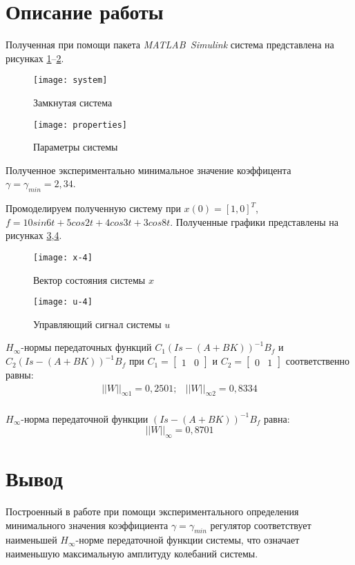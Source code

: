 \documentclass[14pt, a4paper]{extarticle}
\begin{document}
	\newpage
	
	\section*{Описание работы}
	
	Полученная при помощи пакета \textit{MATLAB~Simulink} система представлена на рисунках \ref{fig:system}--\ref{fig:properties}.
	
	\begin{figure}[H]
		\centering
		\texttt{[image: system]}
		\caption{Замкнутая система}
		\label{fig:system}
	\end{figure}
	
	\begin{figure}[H]
		\centering
		\texttt{[image: properties]}
		\caption{Параметры системы}
		\label{fig:properties}
	\end{figure}
	
	Полученное экспериментально минимальное значение коэффицента $\gamma=\gamma_{min}=2,34$.
	
	Промоделируем полученную систему при $x(0)=[1,0]^T$, $f=10sin6t+5cos2t+4cos3t+3cos8t$. Полученные графики представлены на рисунках \ref{fig:x-4},\ref{fig:u-4}.
	
	\begin{figure}[H]
		\centering
		\texttt{[image: x-4]}
		\caption{Вектор состояния системы $x$}
		\label{fig:x-4}
	\end{figure}
	
	\begin{figure}[H]
		\centering
		\texttt{[image: u-4]}
		\caption{Управляющий сигнал системы $u$}
		\label{fig:u-4}
	\end{figure}
	
	$H_\infty$-нормы передаточных функций $C_1(Is-(A+BK))^{-1}B_f$ и $C_2(Is-(A+BK))^{-1}B_f$ при $C_1=\left[\begin{matrix}1 & 0\end{matrix}\right]$ и $C_2=\left[\begin{matrix}0 & 1\end{matrix}\right]$ соответственно равны:
	$$\begin{matrix}
		\left|\left|W\right|\right|_{\infty1} = 0,2501; & \left|\left|W\right|\right|_{\infty2} = 0,8334 \\
	\end{matrix}$$
	
	$H_\infty$-норма передаточной функции $(Is-(A+BK))^{-1}B_f$ равна:
	$$\left|\left|W\right|\right|_\infty=0,8701$$
	
	\newpage
	
	\section*{Вывод}
	
	Построенный в работе при помощи экспериментального определения минимального значения коэффициента $\gamma=\gamma_{min}$ регулятор соответствует наименьшей $H_\infty$-норме передаточной функции системы, что означает наименьшую максимальную амплитуду колебаний системы.
\end{document}
